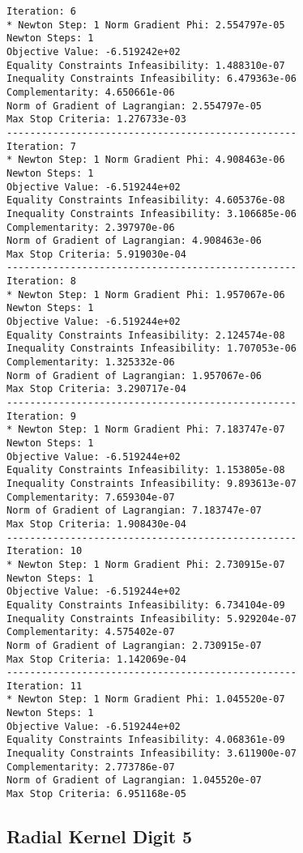 \documentclass{article}
\begin{document}
\begin{minipage}[t]{0.45\textwidth}
\begin{verbatim}
Iteration: 6
* Newton Step: 1 Norm Gradient Phi: 2.554797e-05
Newton Steps: 1
Objective Value: -6.519242e+02
Equality Constraints Infeasibility: 1.488310e-07
Inequality Constraints Infeasibility: 6.479363e-06
Complementarity: 4.650661e-06
Norm of Gradient of Lagrangian: 2.554797e-05
Max Stop Criteria: 1.276733e-03
--------------------------------------------------
Iteration: 7
* Newton Step: 1 Norm Gradient Phi: 4.908463e-06
Newton Steps: 1
Objective Value: -6.519244e+02
Equality Constraints Infeasibility: 4.605376e-08
Inequality Constraints Infeasibility: 3.106685e-06
Complementarity: 2.397970e-06
Norm of Gradient of Lagrangian: 4.908463e-06
Max Stop Criteria: 5.919030e-04
--------------------------------------------------
Iteration: 8
* Newton Step: 1 Norm Gradient Phi: 1.957067e-06
Newton Steps: 1
Objective Value: -6.519244e+02
Equality Constraints Infeasibility: 2.124574e-08
Inequality Constraints Infeasibility: 1.707053e-06
Complementarity: 1.325332e-06
Norm of Gradient of Lagrangian: 1.957067e-06
Max Stop Criteria: 3.290717e-04
--------------------------------------------------
Iteration: 9
* Newton Step: 1 Norm Gradient Phi: 7.183747e-07
Newton Steps: 1
Objective Value: -6.519244e+02
Equality Constraints Infeasibility: 1.153805e-08
Inequality Constraints Infeasibility: 9.893613e-07
Complementarity: 7.659304e-07
Norm of Gradient of Lagrangian: 7.183747e-07
Max Stop Criteria: 1.908430e-04
--------------------------------------------------
Iteration: 10
* Newton Step: 1 Norm Gradient Phi: 2.730915e-07
Newton Steps: 1
Objective Value: -6.519244e+02
Equality Constraints Infeasibility: 6.734104e-09
Inequality Constraints Infeasibility: 5.929204e-07
Complementarity: 4.575402e-07
Norm of Gradient of Lagrangian: 2.730915e-07
Max Stop Criteria: 1.142069e-04
--------------------------------------------------
Iteration: 11
* Newton Step: 1 Norm Gradient Phi: 1.045520e-07
Newton Steps: 1
Objective Value: -6.519244e+02
Equality Constraints Infeasibility: 4.068361e-09
Inequality Constraints Infeasibility: 3.611900e-07
Complementarity: 2.773786e-07
Norm of Gradient of Lagrangian: 1.045520e-07
Max Stop Criteria: 6.951168e-05
\end{verbatim}
\end{minipage}

\subsection{Radial Kernel Digit 5}\label{radial5}
\end{document}
